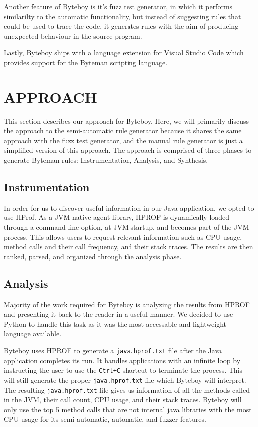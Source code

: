 \documentclass[letterpaper,twocolumn,10pt]{article}
\begin{document}
Another feature of Byteboy is it's fuzz test generator, in which it performs similarilty to the automatic functionality, but instead of suggesting rules that could be used to trace  the code, it generates rules with the aim of producing unexpected behaviour in the source program.

Lastly, Byteboy ships with a language extension for Visual Studio Code which provides support for the Byteman scripting language.

\section{APPROACH}

This section describes our approach for Byteboy. Here, we will primarily discuss the approach to the semi-automatic rule generator because it shares the same approach with the fuzz test generator, and the manual rule generator is just a simplified version of this approach. The approach is comprised of three phases to generate Byteman rules: Instrumentation, Analysis, and Synthesis.

\subsection{Instrumentation}

In order for us to discover useful information in our Java application, we opted to use HProf. As a JVM native agent library, HPROF is dynamically loaded through a command line option, at JVM startup, and becomes part of the JVM process\cite{hprof}. This allows users to request relevant information such as CPU usage, method calls and their call frequency, and their stack traces. The results are then ranked, parsed, and organized through the analysis phase.  

\subsection{Analysis}

Majority of the work required for Byteboy is analyzing the results from HPROF and presenting it back to the reader in a useful manner. We decided to use Python to handle this task as it was the most accessable and lightweight language available. 

Byteboy uses HPROF to generate a {\tt java.hprof.txt} file after the Java application completes its run. It handles applications with an infinite loop by instructing the user to use the {\tt Ctrl+C} shortcut to terminate the process. This will still generate the proper {\tt java.hprof.txt} file which Byteboy will interpret. The resulting {\tt java.hprof.txt} file gives us information of all the methods called in the JVM, their call count, CPU usage, and their stack traces. Byteboy will only use the top 5 method calls that are not internal java libraries with the most CPU usage for its semi-automatic, automatic, and fuzzer features.  
\end{document}
